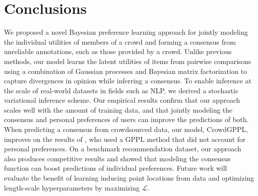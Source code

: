 \section{Conclusions}

We proposed a novel Bayesian preference learning approach 
for jointly modeling the individual utilities of members of a crowd 
and forming a consensus from 
unreliable annotations, such as those provided by a crowd. %
Unlike previous methods, 
our model learns the latent utilities of items from pairwise comparisons using a combination of Gaussian processes and Bayesian matrix factorization to capture divergences in opinion while inferring a consensus.
To enable inference at the scale of real-world datasets in fields such as NLP,
we derived a stochastic variational inference scheme.
Our empirical results confirm that our approach scales well with the amount of training data,
and that jointly modeling the consensus and personal preferences of users can improve the predictions
of both.
When predicting a consensus from crowdsourced data, our model, CrowdGPPL, improves on the results of \citet{simpson2018finding},
who used a GPPL method that did not account for personal preferences.
On a benchmark recommendation dataset, our approach also produces competitive results and showed
that modeling the consensus function can boost predictions of individual preferences.
Future work will evaluate the benefit of learning inducing point locations from data and
optimizing length-scale hyperparameters by maximizing $\mathcal L$.

